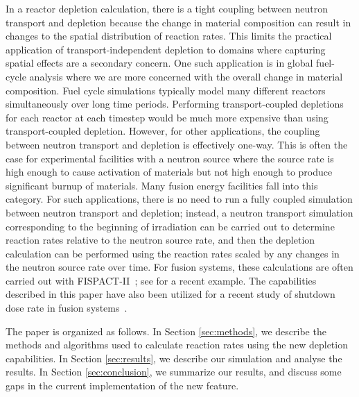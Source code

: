     In a reactor depletion calculation, there is a tight coupling between
    neutron transport and depletion because the change in material composition
    can result in changes to the spatial distribution of reaction rates. This
    limits the practical application of transport-independent depletion to
    domains where capturing spatial effects are a secondary concern. One
    such application is in global fuel-cycle analysis where we are more
    concerned with the overall change in material composition. Fuel cycle
    simulations typically model many different reactors simultaneously over
    long time periods. Performing transport-coupled depletions for each reactor
    at each timestep would be much more expensive than using transport-coupled
    depletion. However, for other applications, the coupling between neutron transport and
    depletion is effectively one-way. This is often the case for experimental
    facilities with a neutron source where the source rate is high enough to
    cause activation of materials but not high enough to produce significant
    burnup of materials. Many fusion energy facilities fall into this category.
    For such applications, there is no need to run a fully coupled simulation
    between neutron transport and depletion; instead, a neutron transport
    simulation corresponding to the beginning of irradiation can be carried out
    to determine reaction rates relative to the neutron source rate, and then
    the depletion calculation can be performed using the reaction rates scaled
    by any changes in the neutron source rate over time. For fusion systems,
    these calculations are often carried out with
    FISPACT-II~\citep{sublet2017nds}; see \citet{eade2020nf} for a recent
    example. The capabilities described in this paper have also been utilized
    for a recent study of shutdown dose rate in fusion
    systems~\citep{peterson2024nf}.

    The paper is organized as follows. In Section \ref{sec:methods}, we describe
    the methods and algorithms used to calculate reaction rates using the new
    depletion capabilities. In Section \ref{sec:results}, we describe our
    simulation and analyse the results. In Section \ref{sec:conclusion}, we
    summarize our results, and discuss some gaps in the current implementation
    of the new feature.



